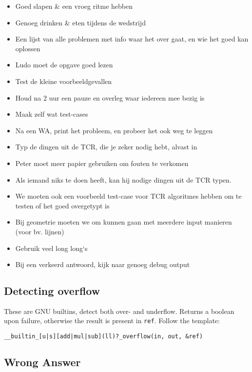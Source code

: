 \documentclass{article}
\begin{document}
\begin{itemize}
	\setlength\itemsep{-.25em}
	\item Goed slapen \& een vroeg ritme hebben
	\item Genoeg drinken \& eten tijdens de wedstrijd
	\item Een lijst van alle problemen met info waar het over gaat, en wie het goed kan oplossen
	\item Ludo moet de opgave goed lezen
	\item Test de kleine voorbeeldgevallen
	\item Houd na 2 uur een pauze en overleg waar iedereen mee bezig is
	\item Maak zelf wat test-cases
	\item Na een WA, print het probleem, en probeer het ook weg te leggen
	\item Typ de dingen uit de TCR, die je zeker nodig hebt, alvast in
	\item Peter moet meer papier gebruiken om fouten te verkomen
	\item Als iemand niks te doen heeft, kan hij nodige dingen uit de TCR typen.
	\item We moeten ook een voorbeeld test-case voor TCR algoritmes hebben om te testen of het goed overgetypt is
	\item Bij geometrie moeten we om kunnen gaan met meerdere input manieren (voor bv. lijnen)
	\item Gebruik veel long long`s
	\item Bij een verkeerd antwoord, kijk naar genoeg debug output
\end{itemize}

\subsection{Detecting overflow}
These are GNU builtins, detect both over- and underflow. Returns a boolean upon failure, otherwise the result is present in \texttt{ref}. Follow the template: 

\texttt{\_\_builtin\_[u|s][add|mul|sub](ll)?\_overflow(in, out, \&ref)} 

\subsection{Wrong Answer}
\end{document}

